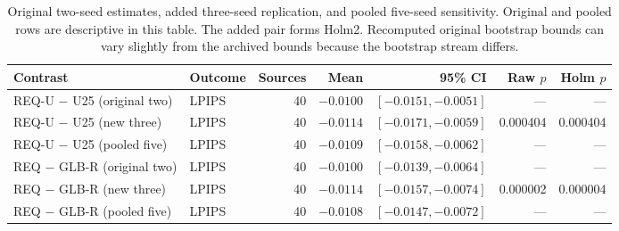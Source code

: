 \begin{table}[!t]
\centering\small
\caption{Original two-seed estimates, added three-seed replication, and pooled five-seed sensitivity. Original and pooled rows are descriptive in this table. The added pair forms Holm2. Recomputed original bootstrap bounds can vary slightly from the archived bounds because the bootstrap stream differs.}
\label{tab:r91-replication}
\begin{tabular}{llrrrrr}
\toprule
Contrast & Outcome & Sources & Mean & 95\% CI & Raw $p$ & Holm $p$\\
\midrule
REQ-U $-$ U25 (original two) & LPIPS & 40 & $-0.0100$ & $[-0.0151, -0.0051]$ & --- & ---\\
REQ-U $-$ U25 (new three) & LPIPS & 40 & $-0.0114$ & $[-0.0171, -0.0059]$ & 0.000404 & 0.000404\\
REQ-U $-$ U25 (pooled five) & LPIPS & 40 & $-0.0109$ & $[-0.0158, -0.0062]$ & --- & ---\\
REQ $-$ GLB-R (original two) & LPIPS & 40 & $-0.0100$ & $[-0.0139, -0.0064]$ & --- & ---\\
REQ $-$ GLB-R (new three) & LPIPS & 40 & $-0.0114$ & $[-0.0157, -0.0074]$ & 0.000002 & 0.000004\\
REQ $-$ GLB-R (pooled five) & LPIPS & 40 & $-0.0108$ & $[-0.0147, -0.0072]$ & --- & ---\\
\bottomrule
\end{tabular}
\end{table}
